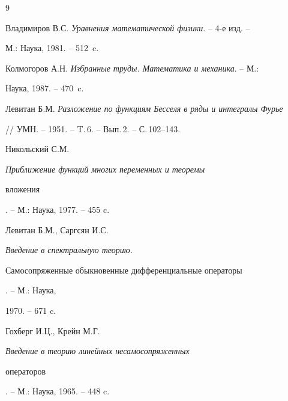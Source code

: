 \begin{thebibliography}{9} 


 




Владимиров В.С. {\em Уравнения математической физики}. -- 4-е изд. -- 


М.: Наука, 1981. -- 512~c. 




Колмогоров А.Н. {\em Избранные труды. Математика и механика}. -- М.: 


Наука, 1987. -- 470~c. 




Левитан Б.М. {\em Разложение по функциям Бесселя в ряды и интегралы Фурье} 


// УМН. -- 1951. -- T.\,6. -- Вып.\,2. -- С.\,102--143. 




Никольский С.М. {\em Приближение функций многих переменных и теоремы 


вложения}. -- М.: Наука, 1977. -- 455 c. 


\bibitem{} 


Левитан Б.М., Саргсян И.С. {\em Введение в спектральную теорию. 


Самосопряженные обыкновенные дифференциальные операторы}. -- М.: Наука, 


1970. -- 671 c. 




Гохберг И.Ц., Крейн М.Г. {\em Введение в теорию линейных несамосопряженных 


операторов}. -- М.: Наука, 1965. -- 448 c. 


 


\end{thebibliography} 


 


\vskip 2cm 


 








 


\label{end} 


 


